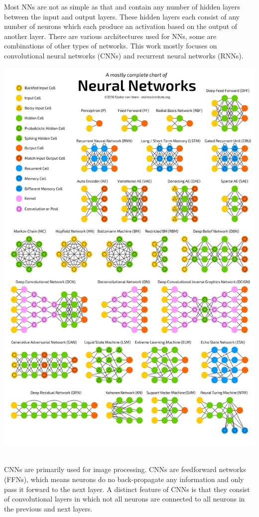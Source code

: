 \documentclass[12pt]{article}
\begin{document}
Most NNs are not as simple as that and contain any number of hidden layers between the input and output layers. These hidden layers each consist of any number of neurons which each produce an activation based on the output of another layer. There are various architectures used for NNs, some are combinations of other types of networks. This work mostly focuses on convolutional neural networks (CNNs) and recurrent neural networks (RNNs).~\cite{SCHMIDHUBER201585}

\includegraphics [width=\textwidth, height=\textheight, keepaspectratio] {neuralnetworks.png}~\cite{netzoo}

CNNs are primarily used for image processing. CNNs are feedforward networks (FFNs), which means neurons do no back-propagate any information and only pass it forward to the next layer. A distinct feature of CNNs is that they consist of convolutional layers in which not all neurons are connected to all neurons in the previous and next layers.~\cite{SCHMIDHUBER201585}
\end{document}
